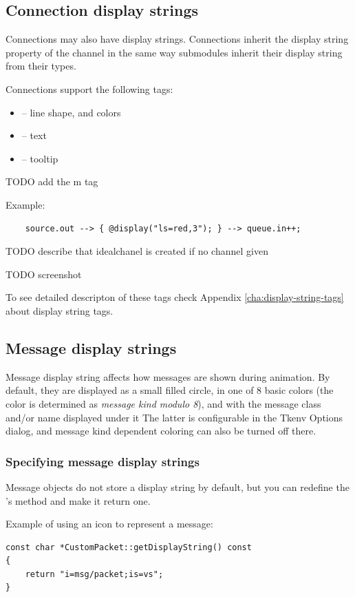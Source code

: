 \subsection{Connection display strings}

Connections may also have display strings. Connections inherit the
display string property of the channel in the same way submodules inherit
their display string from their types.

Connections support the following tags:
\begin{itemize}
  \item{ -- line shape, and colors}
  \item{ -- text}
  \item{ -- tooltip}
\end{itemize}
TODO add the m tag

Example:
\begin{verbatim}
    source.out --> { @display("ls=red,3"); } --> queue.in++;
\end{verbatim}

TODO describe that idealchanel is created if no channel given

TODO screenshot

To see detailed descripton of these tags check
Appendix \ref{cha:display-string-tags} about display string tags.

\subsection{Message display strings}

Message display string affects how messages are shown during animation.
By default, they are displayed as a small filled circle, in one of
8 basic colors (the color is determined as \textit{message kind modulo 8}),
and with the message class and/or name displayed under it
The latter is configurable in the Tkenv Options dialog, and message kind
dependent coloring can also be turned off there.

\subsubsection{Specifying message display strings}
Message objects do not store a display string by default, but you can redefine
the 's  method and make it return
one.

Example of using an icon to represent a message:
\begin{verbatim}
const char *CustomPacket::getDisplayString() const
{
    return "i=msg/packet;is=vs";
}
\end{verbatim}

